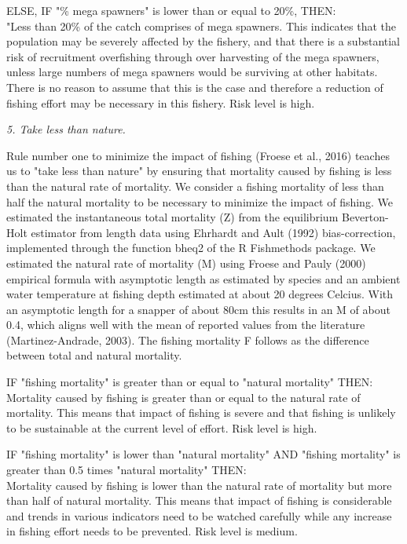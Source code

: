 ELSE, IF "\% mega spawners" is lower than or equal to 20\%, THEN:\\[0cm]
"Less than 20\% of the catch comprises of mega spawners.  This indicates that the population may be severely affected by the fishery, and that there is a substantial risk of recruitment overfishing through over harvesting of the mega spawners, unless large numbers of mega spawners would be surviving at other habitats. There is no reason to assume that this is the case and therefore a reduction of fishing effort may be necessary in this fishery. Risk level is high.

\textit{5. Take less than nature.}

Rule number one to minimize the impact of fishing (Froese et al., 2016) teaches us to "take less than nature" by ensuring that mortality caused by fishing is less than the natural rate of mortality. We consider a fishing mortality of less than half the natural mortality to be necessary to minimize the impact of fishing. We estimated the instantaneous total mortality (Z) from the equilibrium Beverton-Holt estimator from length data using Ehrhardt and Ault (1992) bias-correction, implemented through the function bheq2 of the R Fishmethods package. We estimated the natural rate of mortality (M) using Froese and Pauly (2000) empirical formula with asymptotic length as estimated by species and an ambient water temperature at fishing depth estimated at about 20 degrees Celcius. With an asymptotic length for a snapper of about 80cm this results in an M of about 0.4, which aligns well with the mean of reported values from the literature (Martinez-Andrade, 2003). The fishing mortality F follows as the difference between total and natural mortality.

IF "fishing mortality" is greater than or equal to "natural mortality" THEN:\\[0cm]
Mortality caused by fishing is greater than or equal to the natural rate of mortality. This means that impact of fishing is severe and that fishing is unlikely to be sustainable at the current level of effort. Risk level is high.

IF "fishing mortality" is lower than "natural mortality" AND "fishing mortality" is greater than 0.5 times "natural mortality" THEN:\\[0cm]
Mortality caused by fishing is lower than the natural rate of mortality but more than half of natural mortality. This means that impact of fishing is considerable and trends in various indicators need to be watched carefully while any increase in fishing effort needs to be prevented. Risk level is medium.

